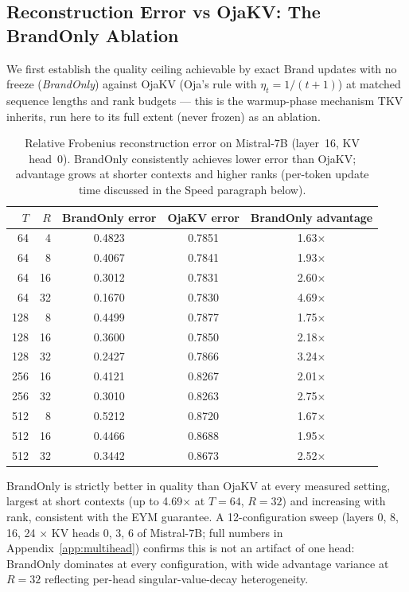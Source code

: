 \documentclass{article}
\begin{document}
\subsection{Reconstruction Error vs OjaKV: The BrandOnly Ablation}
\label{sec:brandonly-ablation}

We first establish the quality ceiling achievable by exact Brand updates
with no freeze (\emph{BrandOnly}) against OjaKV (Oja's rule with
$\eta_t = 1/(t+1)$) at matched sequence lengths and rank budgets --- this
is the warmup-phase mechanism TKV inherits, run here to its full extent
(never frozen) as an ablation.

\begin{table}[t]
\centering
\caption{Relative Frobenius reconstruction error on Mistral-7B (layer~16,
KV head~0).  BrandOnly consistently achieves lower error than OjaKV;
advantage grows at shorter contexts and higher ranks (per-token update time
discussed in the Speed paragraph below).}
\label{tab:recon}
\small
\begin{tabular}{rrccc}
\toprule
$T$ & $R$ & BrandOnly error & OjaKV error & BrandOnly advantage \\
\midrule
 64 &  4 & 0.4823 & 0.7851 & 1.63$\times$ \\
 64 &  8 & 0.4067 & 0.7841 & 1.93$\times$ \\
 64 & 16 & 0.3012 & 0.7831 & 2.60$\times$ \\
 64 & 32 & 0.1670 & 0.7830 & 4.69$\times$ \\
\midrule
128 &  8 & 0.4499 & 0.7877 & 1.75$\times$ \\
128 & 16 & 0.3600 & 0.7850 & 2.18$\times$ \\
128 & 32 & 0.2427 & 0.7866 & 3.24$\times$ \\
\midrule
256 & 16 & 0.4121 & 0.8267 & 2.01$\times$ \\
256 & 32 & 0.3010 & 0.8263 & 2.75$\times$ \\
\midrule
512 &  8 & 0.5212 & 0.8720 & 1.67$\times$ \\
512 & 16 & 0.4466 & 0.8688 & 1.95$\times$ \\
512 & 32 & 0.3442 & 0.8673 & 2.52$\times$ \\
\bottomrule
\end{tabular}
\normalsize
\end{table}

BrandOnly is strictly better in quality than OjaKV at every measured
setting, largest at short contexts (up to 4.69$\times$ at $T=64$, $R=32$)
and increasing with rank, consistent with the EYM guarantee.  A
12-configuration sweep (layers 0, 8, 16, 24 $\times$ KV heads 0, 3, 6 of
Mistral-7B; full numbers in Appendix~\ref{app:multihead}) confirms this is
not an artifact of one head: BrandOnly dominates at every configuration,
with wide advantage variance at $R=32$ reflecting per-head
singular-value-decay heterogeneity.
\end{document}
